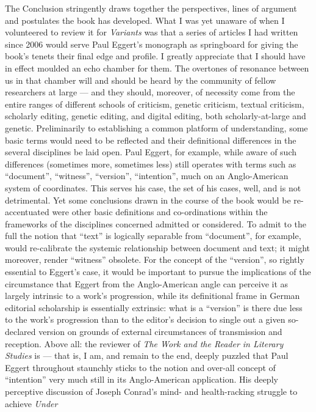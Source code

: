 \begin{review}
The Conclusion stringently draws together the perspectives, lines of
argument and postulates the book has developed. What I was yet unaware
of when I volunteered to review it for \emph{Variants} was that a series
of articles I had written since 2006 would serve Paul Eggert's monograph
as springboard for giving the book's tenets their final edge and
profile. I greatly appreciate that I should have in effect moulded an
echo chamber for them. The overtones of resonance between us in that
chamber will and should be heard by the community of fellow researchers
at large --- and they should, moreover, of necessity come from the
entire ranges of different schools of criticism, genetic criticism,
textual criticism, scholarly editing, genetic editing, and digital
editing, both scholarly-at-large and genetic. Preliminarily to
establishing a common platform of understanding, some basic terms would
need to be reflected and their definitional differences in the several
disciplines be laid open. Paul Eggert, for example, while aware of such
differences (sometimes more, sometimes less) still operates with terms
such as ``document'', ``witness'', ``version'', ``intention'', much on
an Anglo-American system of coordinates. This serves his case, the set
of his cases, well, and is not detrimental. Yet some conclusions drawn
in the course of the book would be re-accentuated were other basic
definitions and co-ordinations within the frameworks of the disciplines
concerned admitted or considered. To admit to the full the notion that
``text'' is logically separable from ``document'', for example, would
re-calibrate the systemic relationship between document and text; it
might moreover, render ``witness'' obsolete. For the concept of the
``version'', so rightly essential to Eggert's case, it would be
important to pursue the implications of the circumstance that Eggert
from the Anglo-American angle can perceive it as largely intrinsic to a
work's progression, while its definitional frame in German editorial
scholarship is essentially extrinsic: what is a ``version'' is there due
less to the work's progression than to the editor's decision to single
out a given so-declared version on grounds of external circumstances of
transmission and reception. Above all: the reviewer of \emph{The Work
and the Reader in Literary Studies} is --- that is, I am, and remain to
the end, deeply puzzled that Paul Eggert throughout staunchly sticks to
the notion and over-all concept of ``intention'' very much still in its
Anglo-American application. His deeply perceptive discussion of Joseph
Conrad's mind- and health-racking struggle to achieve \emph{Under
}
\end{review}
